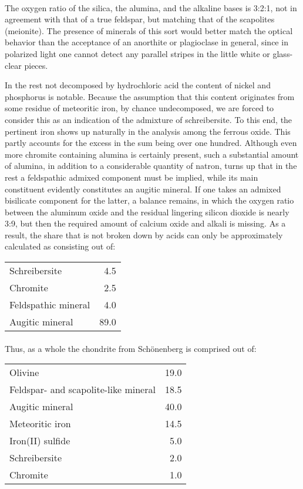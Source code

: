 \documentclass[a4paper, 12pt, oneside]{article}
\begin{document}
\paragraph{}
The oxygen ratio of the silica, the alumina, and the alkaline bases is 3:2:1, not in agreement with that of a true feldspar, but matching that of the scapolites (meionite). The presence of minerals of this sort would better match the optical behavior than the acceptance of an anorthite or plagioclase in general, since in polarized light one cannot detect any parallel stripes in the little white or glass-clear pieces.

In the rest not decomposed by hydrochloric acid the content of nickel and phosphorus is notable. Because the assumption that this content originates from some residue of meteoritic iron, by chance undecomposed, we are forced to consider this as an indication of the admixture of schreibersite. To this end, the pertinent iron shows up naturally in the analysis among the ferrous oxide. This partly accounts for the excess in the sum being over one hundred. Although even more chromite containing alumina is certainly present, such a substantial amount of alumina, in addition to a considerable quantity of natron, turns up that in the rest a feldspathic admixed component must be implied, while its main constituent evidently constitutes an augitic mineral. If one takes an admixed bisilicate component for the latter, a balance remains, in which the oxygen ratio between the aluminum oxide and the residual lingering silicon dioxide is nearly 3:9, but then the required amount of calcium oxide and alkali is missing. As a result, the share that is not broken down by acids can only be approximately calculated as consisting out of:
\begin{center}
    \begin{tabular}{l r}
        Schreibersite & 4.5\\
        Chromite & 2.5\\
        Feldspathic mineral & 4.0\\
        Augitic mineral & 89.0\\
    \end{tabular}
\end{center}
\paragraph{}
Thus, as a whole the chondrite from Schönenberg is comprised out of:
\begin{center}
    \begin{tabular}{l r}
        Olivine & 19.0\\
        Feldspar- and scapolite-like mineral & 18.5\\
        Augitic mineral & 40.0\\
        Meteoritic iron & 14.5\\
        Iron(II) sulfide & 5.0\\
        Schreibersite & 2.0\\
        Chromite & 1.0\\
    \end{tabular}
\end{center}
\end{document}
